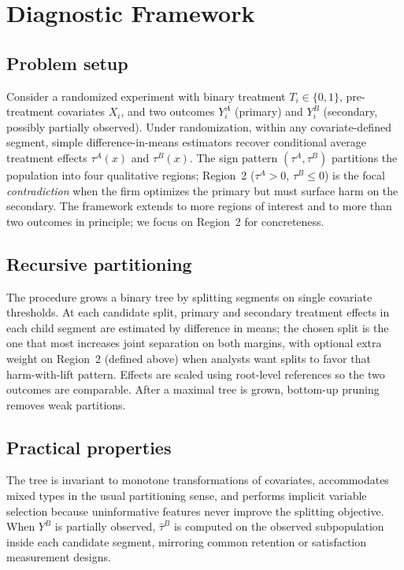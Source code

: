 \documentclass[12pt,a4paper]{article}
\begin{document}
\section{Diagnostic Framework}
\label{sec:framework}

\subsection{Problem setup}

Consider a randomized experiment with binary treatment $T_i\in\{0,1\}$, pre-treatment covariates $X_i$, and two outcomes $Y_i^A$ (primary) and $Y_i^B$ (secondary, possibly partially observed). Under randomization, within any covariate-defined segment, simple difference-in-means estimators recover conditional average treatment effects $\tau^A(x)$ and $\tau^B(x)$. The sign pattern $(\tau^A,\tau^B)$ partitions the population into four qualitative regions; Region~2 ($\tau^A>0$, $\tau^B\le 0$) is the focal \emph{contradiction} when the firm optimizes the primary but must surface harm on the secondary. The framework extends to more regions of interest and to more than two outcomes in principle; we focus on Region~2 for concreteness.

\subsection{Recursive partitioning}

The procedure grows a binary tree by splitting segments on single covariate thresholds. At each candidate split, primary and secondary treatment effects in each child segment are estimated by difference in means; the chosen split is the one that most increases joint separation on both margins, with optional extra weight on Region~2 (defined above) when analysts want splits to favor that harm-with-lift pattern. Effects are scaled using root-level references so the two outcomes are comparable. After a maximal tree is grown, bottom-up pruning removes weak partitions.

\subsection{Practical properties}

The tree is invariant to monotone transformations of covariates, accommodates mixed types in the usual partitioning sense, and performs implicit variable selection because uninformative features never improve the splitting objective. When $Y^B$ is partially observed, $\hat\tau^B$ is computed on the observed subpopulation inside each candidate segment, mirroring common retention or satisfaction measurement designs.
\end{document}
